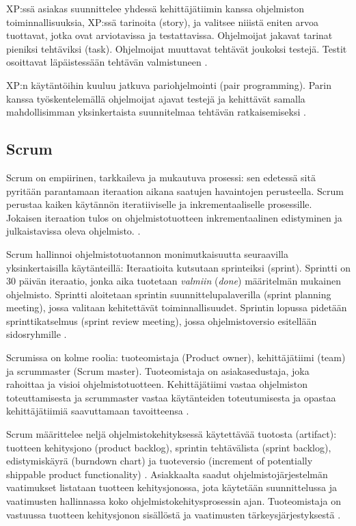 \documentclass[finnish]{tktltiki2}
\theoremstyle{definition}
\theoremstyle{remark}
\begin{document}
{XP:ssä asiakas suunnittelee yhdessä kehittäjätiimin kanssa ohjelmiston  toiminnallisuuksia, XP:ssä tarinoita (story), ja valitsee niiistä eniten arvoa tuottavat, jotka ovat arviotavissa ja testattavissa. Ohjelmoijat jakavat tarinat pieniksi tehtäviksi (task). Ohjelmoijat muuttavat tehtävät joukoksi testejä. Testit osoittavat läpäistessään tehtävän valmistuneen \cite{BEC99}.

XP:n käytäntöihin kuuluu jatkuva pariohjelmointi (pair programming). Parin kanssa työskentelemällä ohjelmoijat ajavat testejä ja kehittävät samalla mahdollisimman yksinkertaista suunnitelmaa tehtävän ratkaisemiseksi \cite{BEC99}.

\subsection{Scrum}

Scrum on empiirinen, tarkkaileva ja mukautuva prosessi: sen edetessä sitä pyritään parantamaan iteraation aikana saatujen havaintojen perusteella.  Scrum perustaa kaiken käytännön iteratiiviselle ja inkrementaaliselle prosessille. Jokaisen iteraation tulos on ohjelmistotuotteen inkrementaalinen edistyminen ja julkaistavissa oleva ohjelmisto. \cite{SCH09}.

Scrum hallinnoi ohjelmistotuotannon monimutkaisuutta seuraavilla yksinkertaisilla käytänteillä:
Iteraatioita kutsutaan sprinteiksi (sprint). Sprintti on 30 päivän iteraatio, jonka aika tuotetaan \textit{valmiin} (\textit{done}) määritelmän mukainen ohjelmisto. Sprintti aloitetaan sprintin suunnittelupalaverilla (sprint planning meeting), jossa valitaan kehitettävät toiminnallisuudet. Sprintin lopussa pidetään sprinttikatselmus (sprint review meeting), jossa ohjelmistoversio esitellään sidosryhmille \cite{SCH09}.

Scrumissa on kolme roolia: tuoteomistaja (Product owner), kehittäjätiimi (team) ja scrummaster (Scrum master). Tuoteomistaja on asiakasedustaja, joka rahoittaa ja visioi ohjelmistotuotteen. Kehittäjätiimi vastaa ohjelmiston toteuttamisesta ja scrummaster vastaa käytänteiden toteutumisesta ja opastaa kehittäjätiimiä saavuttamaan tavoitteensa \cite{SCH09}.

Scrum määrittelee neljä ohjelmistokehityksessä käytettävää tuotosta (artifact): tuotteen kehitysjono (product backlog), sprintin tehtävälista (sprint backlog), edistymiskäyrä (burndown chart) ja tuoteversio (increment of potentially shippable product functionality) \cite{SCH09}
.
Asiakkaalta saadut ohjelmistojärjestelmän vaatimukset listataan tuotteen kehitysjonossa, jota käytetään suunnittelussa ja vaatimusten hallinnassa koko ohjelmistokehitysprosessin ajan. Tuoteomistaja on vastuussa tuotteen kehitysjonon sisällöstä ja vaatimusten tärkeysjärjestyksestä \cite{SCH09}.

}
\end{document}
